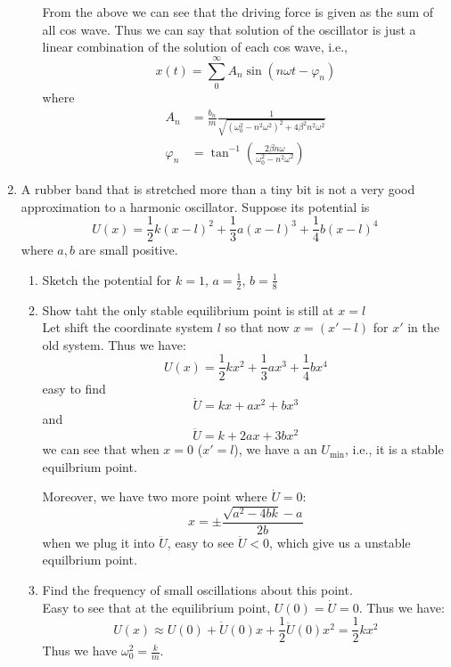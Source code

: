 \documentclass{article}
\begin{document}
\begin{enumerate}
\begin{enumerate}
        From the above we can see that the driving force is given as the sum of all cos wave. Thus we can say that solution of the oscillator is just a linear combination of the solution of each cos wave, i.e.,
        \[
        x(t) = \sum_0^\infty A_n \sin(n\omega t - \varphi_n)
        \]
        where
        \begin{align*}
            A_n &= \frac{b_n}{m} \frac{1}{\sqrt{(\omega_0^2 - n^2\omega^2)^2 + 4\beta^2n^2\omega^2}} \\
            \varphi_n &= \tan^{-1}(\frac{2\beta n\omega}{\omega_0^2-n^2\omega^2}) 
        \end{align*}
    \end{enumerate}
    \item A rubber band that is stretched more than a tiny bit is not a very good approximation to a harmonic oscillator. Suppose its potential is
    \[
    U(x) = \frac{1}{2}k(x-l)^2 + \frac{1}{3}a(x-l)^3 + \frac{1}{4}b(x-l)^4
    \]
    where $a, b$ are small positive.
    \begin{enumerate}
        \item Sketch the potential for $k = 1$, $a = \frac{1}{2}$, $b = \frac{1}{8}$
        \item Show taht the only stable equilibrium point is still at $x = l$\\

        Let shift the coordinate system $l$ so that now $x = (x'-l)$ for $x'$ in the old system. Thus we have:
        \[
            U(x) = \frac{1}{2}kx^2 + \frac{1}{3}ax^3 + \frac{1}{4}bx^4
        \]
        easy to find
        \[
        \dot{U} = kx + ax^2 + bx^3
        \]
        and
        \[
        \ddot{U} = k + 2ax + 3bx^2
        \]
        we can see that when $x = 0$ ($x' = l$), we have a an $U_\text{min}$, i.e., it is a stable equilbrium point.

        Moreover, we have two more point where $\dot{U} = 0$:
        \[
        x = \pm\frac{\sqrt{a^2-4bk}-a}{2b}
        \]
        when we plug it into $\ddot{U}$, easy to see $\ddot{U}<0$, which give us a unstable equilbrium point.
        \item Find the frequency of small oscillations about this point.\\

        Easy to see that at the equilibrium point, $U(0) = \dot{U} = 0$. Thus we have:
        \[
        U(x) \approx U(0) + \dot{U}(0)x + \frac{1}{2}\ddot{U}(0)x^2 = \frac{1}{2}kx^2
        \]
        Thus we have $\omega_0^2 = \frac{k}{m}$.

    \end{enumerate}
\end{enumerate}


\end{document}
